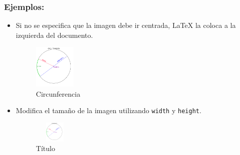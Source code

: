 \documentclass{book}
\begin{document}
\subsubsection*{Ejemplos:}
\begin{itemize}
    \item Si no se especifica que la imagen debe ir centrada, \LaTeX 
 la coloca a la izquierda del documento.
\begin{codigo}    
\begin{LTXexample}[numbers=none]
        \begin{figure}[h!]
          \includegraphics[width=2cm]{imagen-ejemplo}
          \caption{Circunferencia}
          \label{ej_fig_iz}              
        \end{figure}
\end{LTXexample}
\label{ejemplo:figure_sin centrar}
\end{codigo}

    \item Modifica el tamaño de la imagen utilizando \texttt{width} y \texttt{height}.
    \begin{codigo}
    \begin{LTXexample}[numbers=none]
        \begin{figure}[h!]
          \centering
          \includegraphics[width=2cm, height=1cm]{imagen-ejemplo}
          \caption{Título}
          \label{etiqueta}              
        \end{figure}
    \end{LTXexample}
    \label{ejemplo:figure_ancho y alto}
    \end{codigo}


\end{itemize}
\end{document}
